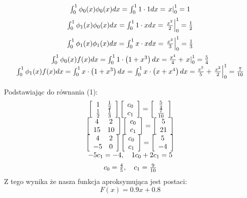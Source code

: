 \documentclass[5]{article}
\begin{document}
$$
\begin{array}{c}
\vspace{2mm}
\int_{0}^{1} \phi_{0}(x) \phi_{0}(x) d x=\int_{0}^{1} 1 \cdot 1 d x=\left.x\right|_{0} ^{1}=1 \\
\vspace{2mm}
\int_{0}^{1} \phi_{1}(x) \phi_{0}(x) d x=\int_{0}^{1} 1 \cdot x d x=\left.\frac{x^{2}}{2}\right|_{0} ^{1}=\frac{1}{2} \\
\vspace{2mm}
\int_{0}^{1} \phi_{1}(x) \phi_{1}(x) d x=\int_{0}^{1} x \cdot x d x=\left.\frac{x^{3}}{3}\right|_{0} ^{1}=\frac{1}{3} \\
\int_{0}^{1} \phi_{0}(x) f(x) d x=\int_{0}^{1} 1 \cdot\left(1+x^{3}\right) d x=\frac{x^{4}}{4}+\left.x\right|_{0} ^{1}=\frac{5}{4} \\
\vspace{2mm}
\int_{0}^{1} \phi_{1}(x) f(x) d x=\int_{0}^{1} x \cdot\left(1+x^{3}\right) d x=\int_{0}^{1} x \cdot\left(x+x^{4}\right) d x=\frac{x^{5}}{5}+\left.\frac{x^{2}}{2}\right|_{0} ^{1}=\frac{7}{10}
\end{array}
$$
Podstawiając do równania (1):
$$
\begin{array}{c}
{\left[\begin{array}{cc}
1 & \frac{1}{2} \\
\frac{1}{2} & \frac{1}{3}
\end{array}\right]\left[\begin{array}{c}
c_{0} \\
c_{1}
\end{array}\right]=\left[\begin{array}{c}
\frac{5}{4} \\
\frac{7}{10}
\end{array}\right]} \\
{\left[\begin{array}{cc}
4 & 2 \\
15 & 10
\end{array}\right]\left[\begin{array}{c}
c_{0} \\
c_{1}
\end{array}\right]=\left[\begin{array}{c}
5 \\
21
\end{array}\right]} \\
{\left[\begin{array}{cc}
4 & 2 \\
-5 & 0
\end{array}\right]\left[\begin{array}{c}
c_{0} \\
c_{1}
\end{array}\right]=\left[\begin{array}{c}
5 \\
-4
\end{array}\right]} \\
\vspace{2mm}
-5 c_{1}=-4, \quad 1 c_{0}+2 c_{1}=5 \\
c_{0}=\frac{4}{5}, \quad c_{1}=\frac{9}{10}
\end{array}
$$
Z tego wynika że nasza funkcja aproksymująca jest postaci:
$$
F(x)=0.9 x+0.8
$$
\end{document}
